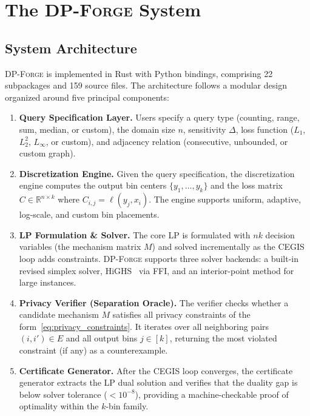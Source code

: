 \documentclass[11pt,a4paper]{article}
\newcommand{\dpforge}{\textsc{DP-Forge}}
\newcommand{\R}{\mathbb{R}}
\begin{document}
\section{The \dpforge{} System}
\label{sec:system}

\subsection{System Architecture}
\label{subsec:architecture}

\dpforge{} is implemented in Rust with Python bindings, comprising 22 subpackages
and 159 source files.  The architecture follows a modular design organized around
five principal components:

\begin{enumerate}[nosep]
  \item \textbf{Query Specification Layer.}  Users specify a query type (counting,
        range, sum, median, or custom), the domain size $n$, sensitivity $\Delta$,
        loss function ($L_1$, $L_2^2$, $L_\infty$, or custom), and adjacency
        relation (consecutive, unbounded, or custom graph).

  \item \textbf{Discretization Engine.}  Given the query specification, the
        discretization engine computes the output bin centers
        $\{y_1, \ldots, y_k\}$ and the loss matrix $C \in \R^{n \times k}$
        where $C_{i,j} = \ell(y_j, x_i)$.  The engine supports uniform, adaptive,
        log-scale, and custom bin placements.

  \item \textbf{LP Formulation \& Solver.}  The core LP is formulated with $nk$
        decision variables (the mechanism matrix $M$) and solved incrementally
        as the CEGIS loop adds constraints.  \dpforge{} supports three solver
        backends: a built-in revised simplex solver, HiGHS~\cite{huangfu2018parallelizing}
        via FFI, and an interior-point method for large instances.

  \item \textbf{Privacy Verifier (Separation Oracle).}  The verifier checks
        whether a candidate mechanism $M$ satisfies all privacy constraints of
        the form~\eqref{eq:privacy_constraints}.  It iterates over all
        neighboring pairs $(i,i') \in E$ and all output bins $j \in [k]$,
        returning the most violated constraint (if any) as a counterexample.

  \item \textbf{Certificate Generator.}  After the CEGIS loop converges, the
        certificate generator extracts the LP dual solution and verifies that the
        duality gap is below solver tolerance ($< 10^{-8}$), providing a
        machine-checkable proof of optimality within the $k$-bin family.
\end{enumerate}
\end{document}
